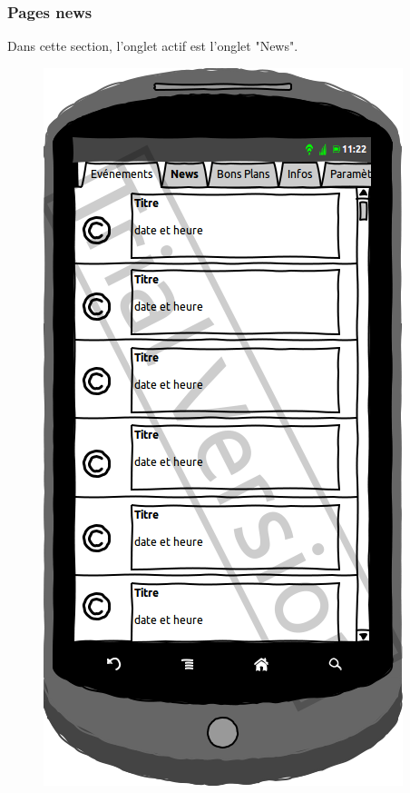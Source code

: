 \documentclass[a4paper, 11px]{article}
\begin{document}
\subsubsection{Pages news}
Dans cette section, l'onglet actif est l'onglet "News".
\vfill
\begin{figure}[htbp]
	\begin{minipage}[c]{.50\linewidth}
		\begin{center}
			\includegraphics[scale=0.3]{../../Sketch/Android/News.png}
		\end{center}
	\end{minipage}
	\hfill
	\begin{minipage}[c]{.50\linewidth}
		\begin{center}

\end{center}
\end{minipage}
\end{figure}
\end{document}
